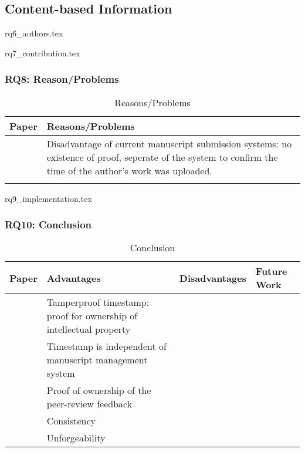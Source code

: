 
\subsection{Content-based Information}
\label{subsec:ContentBasedInformation}

{rq6_authors.tex}

{rq7_contribution.tex}

\clearpage
\subsubsection{RQ8: Reason/Problems}

\begin{longtable}{ |c|p{6cm}| }
	\caption{Reasons/Problems}
	\label{tab:rq8_reason_problem}\\
	\hline
 	\textbf{Paper} & \textbf{Reasons/Problems} \\ [0.5ex] 
 	\hline\hline
 	\endhead
 	\cite{2017_Gipp} & Disadvantage of current manuscript submission systems: no existence of proof, seperate of the system to confirm the time of the author's work was uploaded.\\
	\hline
	\cite{2017_Tackmann} & \\
	\hline
\end{longtable}

{rq9_implementation.tex}

\clearpage
\subsubsection{RQ10: Conclusion}

\begin{longtable}{ |c|p{4cm}|p{4cm}|p{4cm}| }
	\caption{Conclusion}
	\label{tab:rq10_conclusion}\\
	\hline
 	\textbf{Paper} & \textbf{Advantages} & \textbf{Disadvantages} & \textbf{Future Work}\\ [0.5ex] 
 	\hline\hline
 	\endhead
 	\multirow{3}{*}{\cite{2017_Gipp}} & Tamperproof timestamp: proof for ownership of intellectual property & \multirow{3}{*}{\xmark } & \\
	\cline{2-2}
	 & Timestamp is independent of manuscript management system & & \\
	\cline{2-2}
	 & Proof of ownership of the peer-review feedback & & \\
	\hline
	\multirow{3}{*}{\cite{2017_Tackmann}} & Consistency & & \\
	\cline{2-2}
	& Unforgeability & & \\
	\hline
\end{longtable}
